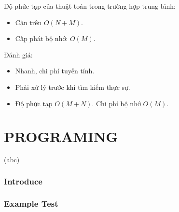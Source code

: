 \documentclass[a4paper,11pt]{article}
\begin{document}
\begin{enumerate}
			Độ phức tạp của thuật toán trong trường hợp trung bình:
			\begin{itemize}
				\item Cận trên $O(N + M)$.
				\item Cấp phát bộ nhớ: $O(M)$.
			\end{itemize}

			Đánh giá:
			\begin{itemize}
				\item Nhanh, chi phí tuyến tính.
				\item Phải xử lý trước khi tìm kiếm thực sự.
				\item Độ phức tạp $O(M + N)$. Chi phí bộ nhớ $O(M)$.
			\end{itemize}
	\end{enumerate}
	
	\part*{PROGRAMING}
	\label{Crossword game}(abc)
	
	
	\setcounter{section}{0}
	\section{Introduce}
	\section{Example Test}
	
\end{document}
